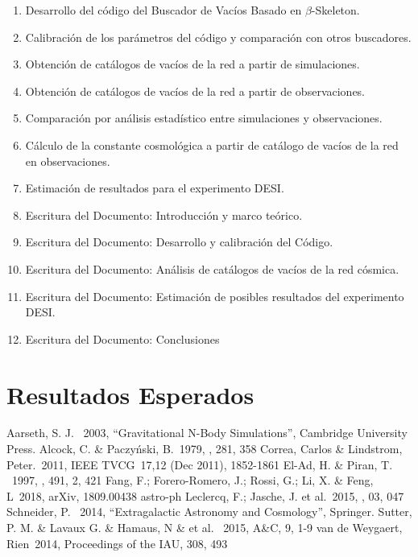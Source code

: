 \documentclass[preprint]{aastex62}
\begin{document}
  
  \begin{enumerate}
  \item Desarrollo del código del Buscador de Vacíos Basado en $\beta$-Skeleton.
  \item Calibración de los parámetros del código y comparación con otros buscadores.
  \item Obtención de catálogos de vacíos de la red a partir de simulaciones.
  \item Obtención de catálogos de vacíos de la red a partir de observaciones.
  \item Comparación por análisis estadístico entre simulaciones y observaciones.
  \item Cálculo de la constante cosmológica a partir de catálogo de vacíos de la red en
    observaciones.
  \item Estimación de resultados para el experimento DESI.
  \item Escritura del Documento: Introducción y marco teórico.
  \item Escritura del Documento: Desarrollo y calibración del Código.
  \item Escritura del Documento: Análisis de catálogos de vacíos de la red cósmica. 
  \item Escritura del Documento: Estimación de posibles resultados del experimento DESI.
  \item Escritura del Documento: Conclusiones
  \end{enumerate}
  
  
  \section{Resultados Esperados}

  
  
  \nocite{*}


  \begin{thebibliography}{}

     Aarseth, S. J. \ 2003, ``Gravitational N-Body Simulations'', Cambridge University Press.
     Alcock, C. \& Paczy\'nski, B.\ 1979, \nat, 281, 358    
     Correa, Carlos \& Lindstrom, Peter.\ 2011,  IEEE TVCG\ 17,12 (Dec 2011), 1852-1861
     El-Ad, H. \& Piran, T. \ 1997, \apj, 491, 2, 421
     Fang, F.; Forero-Romero, J.; Rossi, G.; Li, X. \& Feng, L\ 2018, arXiv, 1809.00438 astro-ph
     Leclercq, F.; Jasche, J. et al.\ 2015, \jcap, 03, 047
     Schneider, P. \ 2014, ``Extragalactic Astronomy and Cosmology'', Springer.
     Sutter, P. M. \& Lavaux G. \& Hamaus, N \& et al. \ 2015, A\&C, 9, 1-9
     van de Weygaert, Rien\ 2014, Proceedings of the IAU, 308, 493   
  
  \end{thebibliography}                                                           
                       

\end{document}
